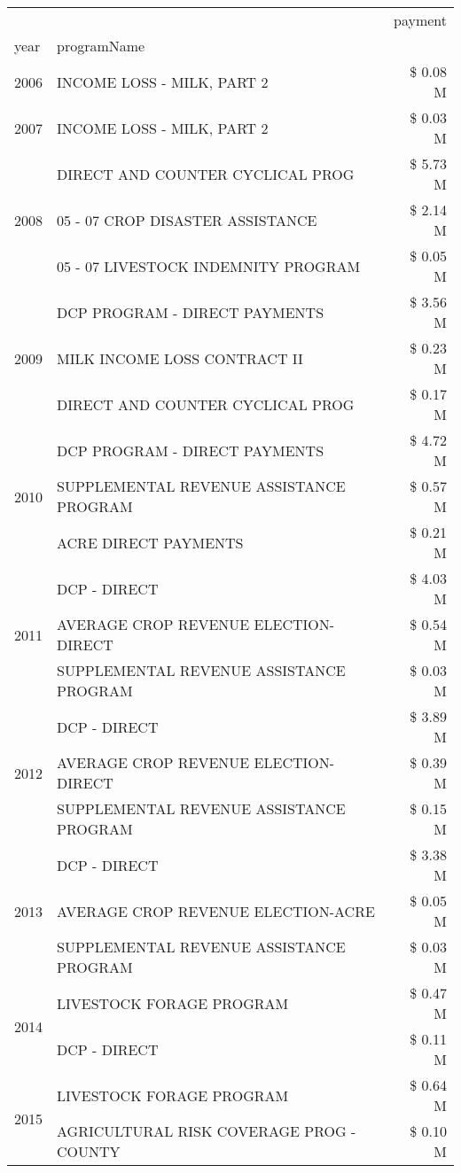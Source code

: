 \begin{tabular}{llr}
\toprule
 &  & payment \\
year & programName &  \\
\midrule
2006 & INCOME LOSS - MILK, PART 2 & \$ 0.08 M \\
\cline{1-3}
2007 & INCOME LOSS - MILK, PART 2 & \$ 0.03 M \\
\cline{1-3}
\multirow[t]{3}{*}{2008} & DIRECT AND COUNTER CYCLICAL PROG & \$ 5.73 M \\
 & 05 - 07 CROP DISASTER ASSISTANCE & \$ 2.14 M \\
 & 05 - 07 LIVESTOCK INDEMNITY PROGRAM & \$ 0.05 M \\
\cline{1-3}
\multirow[t]{3}{*}{2009} & DCP PROGRAM - DIRECT PAYMENTS & \$ 3.56 M \\
 & MILK INCOME LOSS CONTRACT II & \$ 0.23 M \\
 & DIRECT AND COUNTER CYCLICAL PROG & \$ 0.17 M \\
\cline{1-3}
\multirow[t]{3}{*}{2010} & DCP PROGRAM - DIRECT PAYMENTS & \$ 4.72 M \\
 & SUPPLEMENTAL REVENUE ASSISTANCE PROGRAM & \$ 0.57 M \\
 & ACRE DIRECT PAYMENTS & \$ 0.21 M \\
\cline{1-3}
\multirow[t]{3}{*}{2011} & DCP - DIRECT & \$ 4.03 M \\
 & AVERAGE CROP REVENUE ELECTION-DIRECT & \$ 0.54 M \\
 & SUPPLEMENTAL REVENUE ASSISTANCE PROGRAM & \$ 0.03 M \\
\cline{1-3}
\multirow[t]{3}{*}{2012} & DCP - DIRECT & \$ 3.89 M \\
 & AVERAGE CROP REVENUE ELECTION-DIRECT & \$ 0.39 M \\
 & SUPPLEMENTAL REVENUE ASSISTANCE PROGRAM & \$ 0.15 M \\
\cline{1-3}
\multirow[t]{3}{*}{2013} & DCP - DIRECT & \$ 3.38 M \\
 & AVERAGE CROP REVENUE ELECTION-ACRE & \$ 0.05 M \\
 & SUPPLEMENTAL REVENUE ASSISTANCE PROGRAM & \$ 0.03 M \\
\cline{1-3}
\multirow[t]{2}{*}{2014} & LIVESTOCK FORAGE PROGRAM & \$ 0.47 M \\
 & DCP - DIRECT & \$ 0.11 M \\
\cline{1-3}
\multirow[t]{3}{*}{2015} & LIVESTOCK FORAGE PROGRAM & \$ 0.64 M \\
 & AGRICULTURAL RISK COVERAGE PROG - COUNTY & \$ 0.10 M \\

\end{tabular}
